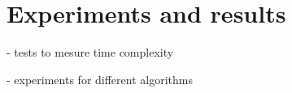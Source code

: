 
\chapter{Experiments and results}
\label{cap:experiments}

- tests to mesure time complexity

- experiments for different algorithms